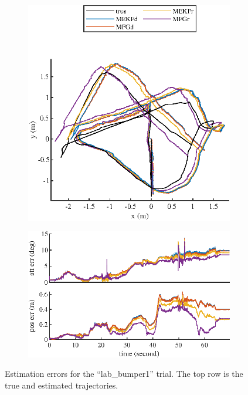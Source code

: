 \begin{figure}
	\centering
	\begin{subfigure}{\textwidth}
		\centering
		\includegraphics[scale=1.3]{figures/VIO-VCU_RVI-trajectory1}
	\end{subfigure}
	\begin{subfigure}{\textwidth}
		\centering
		\vspace{1cm}
		\includegraphics[scale=1.3]{figures/VIO-VCU_RVI-error1}
	\end{subfigure}
	\caption{Estimation errors for the ``lab\_bumper1'' trial. The top row is the true and estimated trajectories.}
	\label{fig:VIO-dataset1}
\end{figure}

